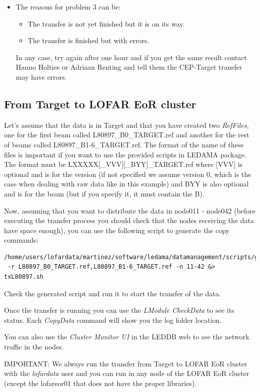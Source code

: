 \documentclass[a4paper,11pt]{article}
\begin{document}
\begin{itemize}
	\item The reasons for problem 3 can be:
	\begin{itemize}
		\item The transfer is not yet finished but it is on its way.
		\item The transfer is finished but with errors.
	\end{itemize}
	In any case, try again after one hour and if you get the same result contact Hanno Holties or Adriaan Renting and tell them the CEP-Target transfer may have errors.
\end{itemize}

\subsection{From Target to LOFAR EoR cluster}

Let's assume that the data is in Target and that you have created two \textit{RefFiles}, one for the first beam called L80897\_B0\_TARGET.ref and another for the rest of beams called L80897\_B1-6\_TARGET.ref. The format of the name of these files is important if you want to use the provided scripts in LEDAMA package. The format must be LXXXXX[\_VVV][\_BYY]\_TARGET.ref where [VVV] is optional and is for the version (if not specified we assume version 0, which is the case when dealing with raw data like in this example) and BYY is also optional and is for the beam (but if you specify it, it must contain the B).

Now, assuming that you want to distribute the data in node011 - node042 (before executing the transfer process you should check that the nodes receiving the data have space enough), you can use the following script to generate the copy commands:
\begin{verbatim}
/home/users/lofardata/martinez/software/ledama/datamanagement/scripts/gencopytarget2eor.py
 -r L80897_B0_TARGET.ref,L80897_B1-6_TARGET.ref -n 11-42 &> txL80897.sh
\end{verbatim}

Check the generated script and run it to start the transfer of  the data.

Once the transfer is running you can use the \textit{LModule CheckData} to see its status. Each \textit{CopyData} command  will show you the log folder location.

You can also use the \textit{Cluster Monitor UI} in the LEDDB web to see the network traffic in the nodes.

IMPORTANT: We always run the transfer from Target to LOFAR EoR cluster with the \textit{lofardata} user and you can run in any node of the LOFAR EoR cluster (except the lofareor01 that does not have the proper libraries).
\end{document}
